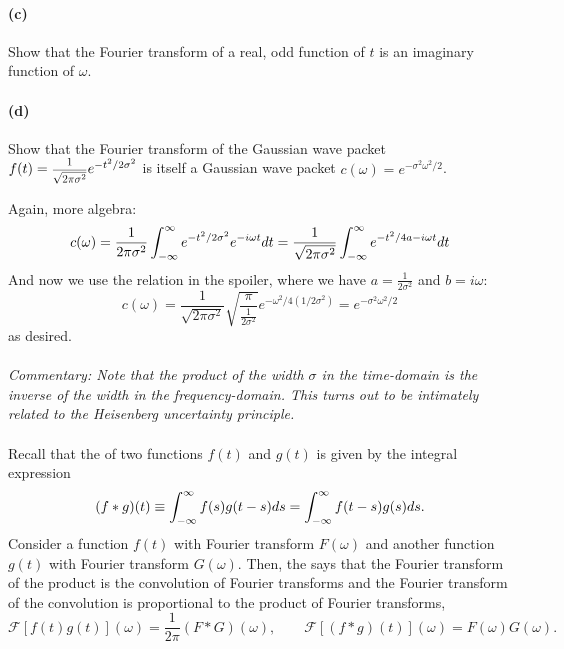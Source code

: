 \documentclass{article}
\begin{document}
\paragraph{(c)}		\extrapart
Show that the Fourier transform of a real, odd function of $t$ is an imaginary function of $\omega$.

\paragraph{(d)}
Show that the Fourier transform of the Gaussian wave packet $f(t) = \sqrtfinv{2\pi\sigma^{2}}e^{-t^{2}/2\sigma^{2}}$ is itself a Gaussian wave packet 
$c(\omega) = e^{-\sigma^{2}\omega^{2}/2}$.

\begin{solution}
	Again, more algebra:
	\[
		c(\omega) = \frac{1}{2\pi \sigma^2}\int_{-\infty}^{\infty} e^{-t^2 /2\sigma^2} e^{- i \omega t} dt = \frac{1}{\sqrt{2\pi \sigma^2} }\int_{-\infty}^{\infty} e^{-t^2 / 4a - i \omega t} dt
	\]
	And now we use the relation in the spoiler, where we have $a = \frac{1}{2\sigma^2}$ and $b = i \omega$:
	\[
		c(\omega) = \frac{1}{\sqrt{2 \pi \sigma^2} }\sqrt{\frac{\pi}{\frac{1}{2\sigma^2}}} e^{-\omega^2/4(1 / 2\sigma^2)} = e^{-\sigma^2\omega^2 / 2}
	\] 
	as desired.
\end{solution}
\paragraph{}
\emph{Commentary: Note that the product of the width $\sigma$ in the time-domain is the inverse of the width in the frequency-domain.  This turns out
to be intimately related to the Heisenberg uncertainty principle.}

\phline
\paragraph{}
Recall that the  of two functions $f(t)$ and $g(t)$ is given by the integral expression
	\begin{equation*}
		(f\ast g)(t) \equiv \int_{-\infty}^{\infty} f(s)g(t-s)ds = \int_{-\infty}^{\infty} f(t-s)g(s)ds.
	\end{equation*}
Consider a function $f(t)$ with Fourier transform $F(\omega)$ and another function $g(t)$ with Fourier transform $G(\omega)$.  
Then, the  says that the Fourier transform of the
product is the convolution of Fourier transforms and the Fourier transform of the convolution is proportional to the product of Fourier transforms,
	\begin{equation*}
		\mathcal{F}[f(t)g(t)](\omega) = \frac{1}{2\pi}(F\ast G)(\omega),	\qquad		\mathcal{F}[(f\ast g)(t)](\omega) =  F(\omega)G(\omega).
	\end{equation*}
\end{document}
